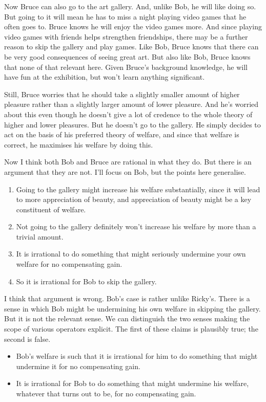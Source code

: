 \documentclass[
  11pt,
  letterpaper,
  DIV=11,
  numbers=noendperiod,
  twoside]{scrartcl}
\providecommand{\tightlist}{%
  \setlength{\itemsep}{0pt}\setlength{\parskip}{0pt}}
\begin{document}
Now Bruce can also go to the art gallery. And, unlike Bob, he will like
doing so. But going to it will mean he has to miss a night playing video
games that he often goes to. Bruce knows he will enjoy the video games
more. And since playing video games with friends helps strengthen
friendships, there may be a further reason to skip the gallery and play
games. Like Bob, Bruce knows that there can be very good consequences of
seeing great art. But also like Bob, Bruce knows that none of that
relevant here. Given Bruce's background knowledge, he will have fun at
the exhibition, but won't learn anything significant.

Still, Bruce worries that he should take a slightly smaller amount of
higher pleasure rather than a slightly larger amount of lower pleasure.
And he's worried about this even though he doesn't give a lot of
credence to the whole theory of higher and lower pleasures. But he
doesn't go to the gallery. He simply decides to act on the basis of his
preferred theory of welfare, and since that welfare is correct, he
maximises his welfare by doing this.

Now I think both Bob and Bruce are rational in what they do. But there
is an argument that they are not. I'll focus on Bob, but the points here
generalise.

\begin{enumerate}
\def\labelenumi{\arabic{enumi}.}
\tightlist
\item
  Going to the gallery might increase his welfare substantially, since
  it will lead to more appreciation of beauty, and appreciation of
  beauty might be a key constituent of welfare.
\item
  Not going to the gallery definitely won't increase his welfare by more
  than a trivial amount.
\item
  It is irrational to do something that might seriously undermine your
  own welfare for no compensating gain.
\item
  So it is irrational for Bob to skip the gallery.
\end{enumerate}

I think that argument is wrong. Bob's case is rather unlike Ricky's.
There is a sense in which Bob might be undermining his own welfare in
skipping the gallery. But it is not the relevant sense. We can
distinguish the two senses making the scope of various operators
explicit. The first of these claims is plausibly true; the second is
false.

\begin{itemize}
\tightlist
\item
  Bob's welfare is such that it is irrational for him to do something
  that might undermine it for no compensating gain.
\item
  It is irrational for Bob to do something that might undermine his
  welfare, whatever that turns out to be, for no compensating gain.
\end{itemize}
\end{document}
